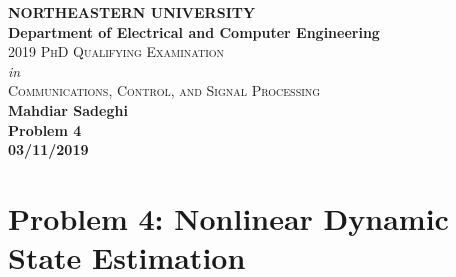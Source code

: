 \documentclass[12pt]{article}
\begin{document}
\begin{titlepage}
	\begin{center}
        \textbf{\LARGE{NORTHEASTERN UNIVERSITY}} \\
                \vspace{2mm} %
            \textbf{\Large{Department of Electrical and Computer Engineering}}\\
                \vspace{15mm} %
            \LARGE\textsc{2019 PhD Qualifying Examination} \\
                \vspace{2mm} %
            \Large \textit{in} \\
            \Large\textsc {Communications, Control, and Signal Processing}\\
                \vspace{30mm} %
            \textbf{\LARGE{Mahdiar Sadeghi}} \\
            \textbf{\LARGE{Problem 4}} \\
            \textbf{\LARGE{03/11/2019}}

    \end{center}
\end{titlepage}
\section*{Problem 4: Nonlinear Dynamic State Estimation}
\end{document}
